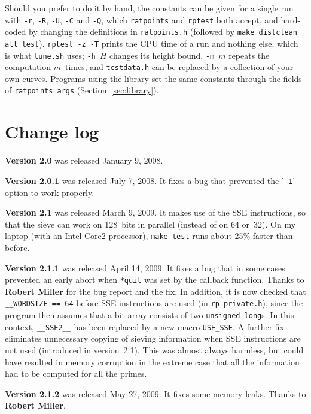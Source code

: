 \documentclass[12pt,a4paper,oneside]{amsart}
\begin{document}
Should you prefer to do it by hand, the constants can be given for a single
run with \verb+-r+, \verb+-R+, \verb+-U+, \verb+-C+ and \verb+-Q+, which
\texttt{ratpoints} and \texttt{rptest} both accept, and hard-coded by
changing the definitions in \texttt{ratpoints.h} (followed by \texttt{make
distclean all test}). \texttt{rptest -z -T} prints the CPU time of a run and
nothing else, which is what \texttt{tune.sh} uses; \verb+-h+~$H$ changes its
height bound, \verb+-m+~$m$ repeats the computation $m$~times, and
\texttt{testdata.h} can be replaced by a collection of your own curves.
Programs using the library set the same constants through the fields of
\texttt{ratpoints\_args} (Section~\ref{sec:library}).


\section{Change log}\label{sec:changelog}

\textbf{Version 2.0} was released January 9, 2008.

\textbf{Version 2.0.1} was released July 7, 2008. It fixes a bug that prevented the
'\texttt{-1}' option to work properly.

\textbf{Version 2.1} was released March 9, 2009. It makes use of the SSE instructions,
so that the sieve can work on 128~bits in parallel (instead of on 64 or~32).
On my laptop (with an Intel Core2 processor), \texttt{make test} runs about
25\% faster than before.

\textbf{Version 2.1.1} was released April 14, 2009. It fixes a bug that in some
cases prevented an early abort when \texttt{*quit} was set by the callback function.
Thanks to \textbf{Robert Miller} for the bug report and the fix. In addition, it is now
checked that \verb+__WORDSIZE == 64+ before SSE instructions are used
(in \texttt{rp-private.h}), since the program then assumes that a bit array consists
of two \texttt{unsigned long}s. In this context, \verb+__SSE2__+ has been replaced
by a new macro \verb+USE_SSE+. A further fix eliminates unnecessary copying
of sieving information when SSE instructions are not used (introduced in version~2.1).
This was almost always harmless, but could have resulted in memory corruption
in the extreme case that all the information had to be computed for all the
primes.

\textbf{Version 2.1.2} was released May 27, 2009. It fixes some memory leaks.
Thanks to \textbf{Robert Miller}.
\end{document}
